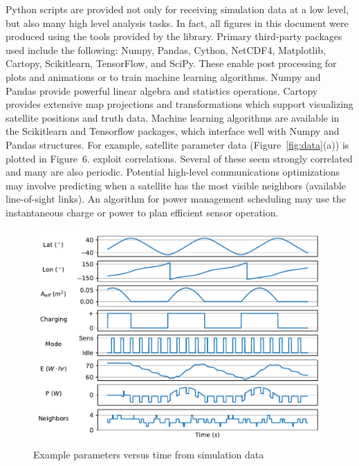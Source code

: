 \documentclass[conference]{IEEEtran}
\begin{document}
Python scripts are provided not only for receiving simulation data at a low
level, but also many high level analysis tasks.  In fact, all figures in this
document were produced using the tools provided by the library.  Primary
third-party packages used include the following: Numpy, Pandas, Cython, NetCDF4,
Matplotlib, Cartopy, Scikitlearn, TensorFlow, and SciPy.  These enable post
processing for plots and animations or to train machine learning algorithms.
Numpy and Pandas provide powerful linear algebra and statistics operations.
Cartopy provides extensive map projections and transformations which support
visualizing satellite positions and truth data.  Machine learning algorithms are
available in the Scikitlearn and Tensorflow packages, which interface well with
Numpy and Pandas structures.  For example, satellite parameter data
(Figure~\ref{fig:data}(a)) is plotted in Figure~6. %
exploit correlations.  Several of these seem strongly correlated and many are
also periodic.  Potential high-level communications optimizations may involve
predicting when a satellite has the most visible neighbors (available
line-of-sight links).  An algorithm for power management scheduling may use the
instantaneous charge or power to plan efficient sensor operation.

\begin{figure}[t]
  \begin{center}
    \includegraphics[width=0.9\linewidth]{images/param_plot.pdf}
  \caption{Example parameters versus time from simulation data}
  \end{center}
  \label{fig:processing}
\end{figure}

\end{document}

